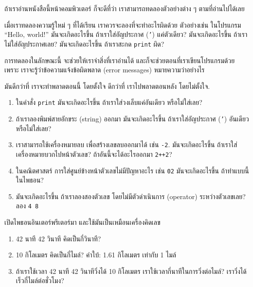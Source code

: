 \begin{exercise}

ถ้าเราอ่านหนังสือนี้หน้าคอมพิวเตอร์ ก็จะดีที่ว่า เราสามารถทดลองตัวอย่างต่าง ๆ ตามที่อ่านไปได้เลย

เมื่อเราทดลองความรู้ใหม่ ๆ ที่ได้เรียน เราควรจะลองที่จะทำอะไรผิดด้วย
ตัวอย่างเช่น ในโปรแกรม ``Hello, world!'' 
มันจะเกิดอะไรขึ้น ถ้าเราใส่อัญประกาศ (\texttt{'}) แค่ตัวเดียว?
มันจะเกิดอะไรขึ้น ถ้าเราไม่ใส่อัญประกาศเลย?
มันจะเกิดอะไรขึ้น ถ้าเราสะกด \texttt{print} ผิด?

การทดลองในลักษณะนี้ จะช่วยให้เราจำสิ่งที่เราอ่านได้
และก็จะช่วยตอนที่เราเขียนโปรแกรมด้วย
เพราะ เราจะรู้ว่าข้อความแจ้งข้อผิดพลาด (error messages) หมายความว่าอย่างไร

มันดีกว่าที่ เราจะทำพลาดตอนนี้ โดยตั้งใจ
ดีกว่าที่ เราไปพลาดตอนหลัง โดยไม่ตั้งใจ.

\begin{enumerate}

\item ในคำสั่ง \texttt{print} 
มันจะเกิดอะไรขึ้น ถ้าเราใส่วงเล็บแค่อันเดียว หรือไม่ใส่เลย?

\item ถ้าเราลองพิมพ์สายอักขระ (string) ออกมา
มันจะเกิดอะไรขึ้น ถ้าเราใส่อัญประกาศ (\texttt{'}) อันเดียว
หรือไม่ใส่เลย?

\item เราสามารถใช้เครื่องหมายลบ เพื่อสร้างเลขลบออกมาได้ เช่น
\texttt{-2}.  
มันจะเกิดอะไรขึ้น ถ้าเราใส่เครื่องหมายบวกไปหน้าตัวเลข?
ถ้าอันนี้จะได้อะไรออกมา \texttt{2++2}?

\item ในคณิตศาสตร์ การใส่ศูนย์ข้างหน้าตัวเลขไม่มีปัญหาอะไร เช่น \texttt{02}
มันจะเกิดอะไรขึ้น ถ้าทำแบบนี้ในไพธอน?

\item มันจะเกิดอะไรขึ้น ถ้าเราลองสองตัวเลข โดยไม่มีตัวดำเนินการ (operator) ระหว่างตัวเลขเลย? 
ลอง \texttt{4 8}

\end{enumerate}

\end{exercise}



\begin{exercise}

เปิดไพธอนอินเตอร์พรีเตอร์มา และใช้มันเป็นเหมือนเครื่องคิดเลข

\begin{enumerate}

\item 42 นาที 42 วินาที คิดเป็นกี่วินาที?

\item 10 กิโลเมตร คิดเป็นกี่ไมล์?
คำใบ้: 1.61 กิโลเมตร เท่ากับ 1 ไมล์

\item ถ้าเราใช้เวลา 42 นาที 42 วินาทีวิ่งได้ 10 กิโลเมตร
เราใช้เวลากี่นาทีในการวิ่งต่อไมล์?
เราวิ่งได้เร็วกี่ไมล์ต่อชั่วโมง?


\end{enumerate}

\end{exercise}




